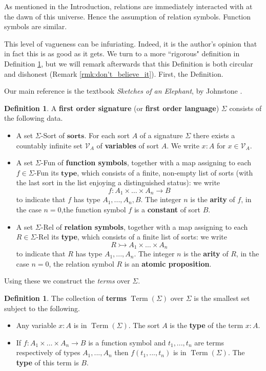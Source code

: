 \documentclass[12pt]{article}
\theoremstyle{plain}
\theoremstyle{definition}
\newtheorem{defn}[thm]{Definition} %
\newcommand{\call}[1]{\mathcal{#1}}
\newcommand{\lto}{\longrightarrow}
\begin{document}
	As mentioned in the Introduction, relations are immediately interacted with at the dawn of this universe. Hence the assumption of relation symbols. Function symbols are similar.
	
	This level of vagueness can be infuriating. Indeed, it is the author's opinion that in fact this is as good as it gets. We turn to a more ``rigorous" definition in Definition \ref{def:first_order_language}, but we will remark afterwards that this Definition is both circular and dishonest (Remark \ref{rmk:don't_believe_it}). First, the Definition.
	
	Our main reference is the textbook \emph{Sketches of an Elephant}, by Johnstone \cite{Johnstone}.
	\begin{defn}\label{def:first_order_language}
		A \textbf{first order signature} (or \textbf{first order language}) $\Sigma$ consists of the following data.
		\begin{itemize}
			\item A set $\Sigma$-Sort of $\textbf{sorts}$. For each sort $A$ of a signature $\Sigma$ there exists a countably infinite set $\call{V}_A$ of \textbf{variables} of sort $A$. We write $x:A$ for $x \in \call{V}_A$. 
			\item A set $\Sigma$-Fun of \textbf{function symbols}, together with a map assigning to each $f \in \Sigma$-Fun its $\textbf{type}$, which consists of a finite, non-empty list of sorts (with the last sort in the list enjoying a distinguished status): we write
			\begin{equation}
				f: A_1 \times \hdots\times A_n \lto B
			\end{equation}
			to indicate that $f$ has type $A_1,...,A_n,B$. The integer $n$ is the \textbf{arity} of $f$, in the case $n = 0$,the function symbol $f$ is a \textbf{constant} of sort $B$.
			\item A set $\Sigma$-Rel of \textbf{relation symbols}, together with a map assigning to each $R \in \Sigma$-Rel its \textbf{type}, which consists of a finite list of sorts: we write
			\begin{equation}
				R \rightarrowtail A_1 \times \hdots \times A_n
			\end{equation}
			to indicate that $R$ has type $A_1,...,A_n$. The integer $n$ is the \textbf{arity} of $R$, in the case $n = 0$, the relation symbol $R$ is an \textbf{atomic proposition}.
		\end{itemize}
	\end{defn}
	Using these we construct the \emph{terms} over $\Sigma$.
	\begin{defn}
		The collection of \textbf{terms} $\operatorname{Term}(\Sigma)$ over $\Sigma$ is the smallest set subject to the following.
		\begin{itemize}
			\item Any variable $x:A$ is in $\operatorname{Term}(\Sigma)$. The sort $A$ is the \textbf{type} of the term $x:A$.
			\item If $f: A_1 \times \hdots \times A_n \lto B$ is a function symbol and $t_1,...,t_n$ are terms respectively of types $A_1,...,A_n$ then $f(t_1,...,t_n)$ is in $\operatorname{Term}(\Sigma)$. The \textbf{type} of this term is $B$.
		\end{itemize}
	\end{defn}
\end{document}
